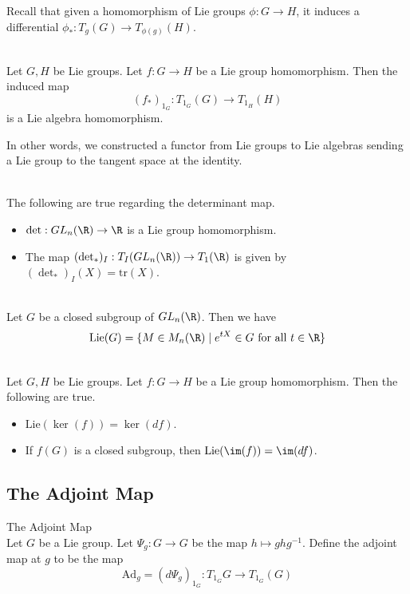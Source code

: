 \documentclass[a4paper]{article}
\begin{document}
Recall that given a homomorphism of Lie groups $\phi:G\to H$, it induces a differential $\phi_\ast:T_g(G)\to T_{\phi(g)}(H)$. 

\begin{prp}{}{}\\
Let $G,H$ be Lie groups. Let $f:G\to H$ be a Lie group homomorphism. Then the induced map $$(f_\ast)_{1_G}:T_{1_G}(G)\to T_{1_H}(H)$$ is a Lie algebra homomorphism. 
\end{prp}

In other words, we constructed a functor from Lie groups to Lie algebras sending a Lie group to the tangent space at the identity. 

\begin{eg}{}{}\\
The following are true regarding the determinant map. 
\begin{itemize}
\item $\det:GL_n(\R)\to\R$ is a Lie group homomorphism. 
\item The map $(\det_\ast)_I:T_I(GL_n(\R))\to T_1(\R)$ is given by $(\det_\ast)_I(X)=\text{tr}(X)$. 
\end{itemize}
\end{eg}

\begin{eg}{}{}\\
Let $G$ be a closed subgroup of $GL_n(\R)$. Then we have $$\text{Lie}(G)=\{M\in M_n(\R)\;|\;e^{tX}\in G\text{ for all }t\in\R\}$$
\end{eg}

\begin{prp}{}{}\\
Let $G,H$ be Lie groups. Let $f:G\to H$ be a Lie group homomorphism. Then the following are true. 
\begin{itemize}
\item $\text{Lie}(\ker(f))=\ker(df)$. 
\item If $f(G)$ is a closed subgroup, then $\text{Lie}(\im(f))=\im(df)$. 
\end{itemize}
\end{prp}

\subsection{The Adjoint Map}
\begin{defn}{The Adjoint Map}{}\\
Let $G$ be a Lie group. Let $\Psi_g:G\to G$ be the map $h\mapsto ghg^{-1}$. Define the adjoint map at $g$ to be the map $$\text{Ad}_g=(d\Psi_g)_{1_G}:T_{1_G}G\to T_{1_G}(G)$$
\end{defn}
\end{document}
